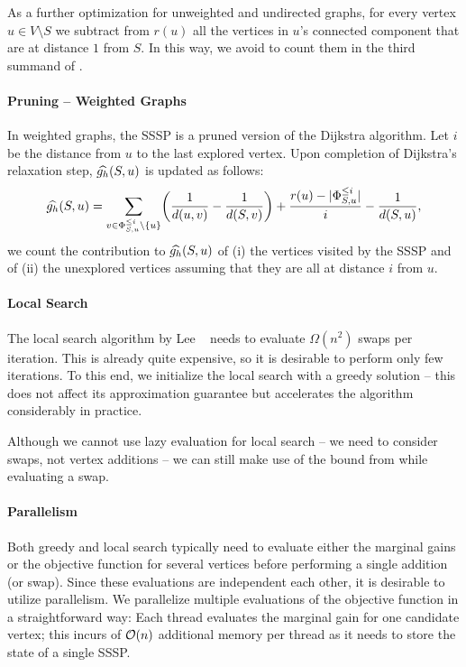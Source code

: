 As a further optimization for unweighted and undirected graphs, for every vertex
$u \in V \setminus S$ we subtract from $r(u)$ all the vertices in $u$'s connected
component that are at distance $1$ from $S$.
In this way, we avoid to count them in the third summand of .


\paragraph{Pruning -- Weighted Graphs}
%
In weighted graphs, the SSSP is a pruned version of the Dijkstra algorithm. Let
$i$ be the distance from $u$ to the last explored vertex. Upon completion of
Dijkstra's relaxation step, $\widehat{g_h}(S, u)$ is updated as follows:
%
\begin{equation}
\label{eq:gh-gc-gharmupp-update}
\gharmupp(S, u) =
\sum_{v\in \PhiSu^{\le i} \setminus \set{u}}\roundb{\frac{1}{d(u, v)} - \frac{1}{d(S, v)}} +
\frac{r(u) - |\PhiSu^{\le i}|}{i} - \frac{1}{d(S, u)},
\end{equation}
%
\ie we count the contribution to $\widehat{g_h}(S, u)$ of (i) the vertices visited
by the SSSP and of (ii) the unexplored vertices assuming that they are all at
distance $i$ from $u$.

\paragraph{Local Search}
%
The local search algorithm by Lee \etal~\cite{DBLP:journals/siamdm/LeeMNS10}
needs to evaluate $\Omega(n^2)$ swaps per iteration. This is already quite expensive,
so it is desirable to perform only few iterations. To this end, we initialize the local
search with a greedy solution -- this does not affect its approximation guarantee but
accelerates the algorithm considerably in practice.

Although we cannot use lazy evaluation for local search -- we need to consider swaps,
not vertex additions -- we can still make use of the bound from 
while evaluating a swap.

\paragraph{Parallelism}
%
Both greedy and local search typically need to evaluate either the
marginal gains or the objective function for several vertices before performing
a single addition (or swap). Since these evaluations are independent  each
other, it is desirable to utilize parallelism. We parallelize multiple evaluations
of the objective function in a straightforward way: Each thread evaluates the marginal
gain for one candidate vertex; this incurs of $\mathcal{O}(n)$ additional memory per thread
as it needs to store the state of a single SSSP.


